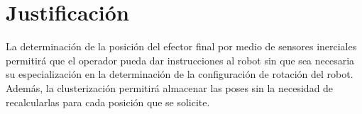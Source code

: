 \section{Justificación}

La determinación de la posición del efector final por medio de sensores inerciales permitirá que el operador pueda dar instrucciones al robot sin que sea necesaria su especialización en la determinación de la configuración de rotación del robot. Además, la clusterización permitirá almacenar las poses sin la necesidad de recalcularlas para cada posición que se solicite.